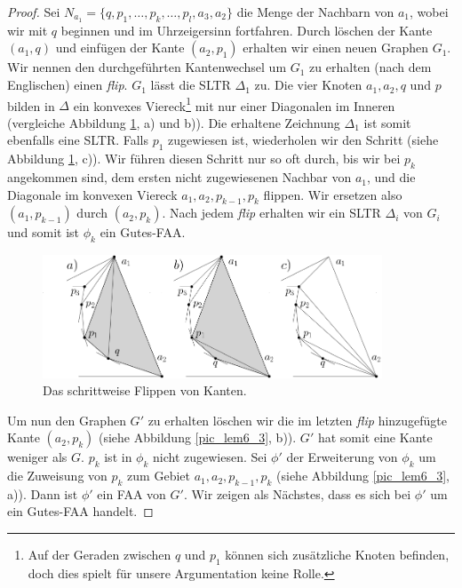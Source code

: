\begin{proof}
Sei $N_{a_1} = \{q,p_1,\ldots,p_k,\ldots,p_l,a_3,a_2\}$ die Menge der Nachbarn von $a_1$, wobei wir mit $q$ beginnen und im Uhrzeigersinn fortfahren. Durch löschen der Kante $(a_1,q)$ und einfügen der Kante $(a_2,p_1)$ erhalten wir einen neuen Graphen $G_1$. Wir nennen den durchgeführten Kantenwechsel um $G_1$ zu erhalten (nach dem Englischen) einen \textit{flip}. $G_1$ lässt die SLTR $\Delta_1$ zu. Die vier Knoten $a_1,a_2,q$ und $p$ bilden in $\Delta$ ein konvexes Viereck\footnote{Auf der Geraden zwischen $q$ und $p_1$ können sich zusätzliche Knoten befinden, doch dies spielt für unsere Argumentation keine Rolle.} mit nur einer Diagonalen im Inneren (vergleiche Abbildung \ref{pic_lem6_2}, a) und b)). Die erhaltene Zeichnung $\Delta_1$ ist somit ebenfalls eine SLTR. Falls $p_1$ zugewiesen ist, wiederholen wir den Schritt (siehe Abbildung \ref{pic_lem6_2}, c)). Wir führen diesen Schritt nur so oft durch, bis wir bei $p_k$ angekommen sind, dem ersten nicht zugewiesenen Nachbar von $a_1$, und die Diagonale im konvexen Viereck $a_1,a_2,p_{k-1},p_k$ flippen. Wir ersetzen also $(a_1,p_{k-1})$ durch $(a_2,p_{k})$. Nach jedem \textit{flip} erhalten wir ein SLTR $\Delta_i$ von $G_i$ und somit ist $\phi_k$ ein Gutes-FAA.

\begin{figure}
	\centering
	  \includegraphics[width=0.9\textwidth]{lem6_2.png}
    	\caption{Das schrittweise Flippen von Kanten.}
    	\label{pic_lem6_2}
\end{figure}

Um nun den Graphen $G'$ zu erhalten löschen wir die im letzten \textit{flip} hinzugefügte Kante $(a_2,p_{k})$ (siehe Abbildung \ref{pic_lem6_3}, b)). $G'$ hat somit eine Kante weniger als $G$. $p_k$ ist in $\phi_k$ nicht zugewiesen. Sei $\phi'$ der Erweiterung von $\phi_k$ um die Zuweisung von $p_k$ zum Gebiet $a_1,a_2,p_{k-1},p_k$ (siehe Abbildung \ref{pic_lem6_3}, a)). Dann ist $\phi'$ ein FAA von $G'$. Wir zeigen als Nächstes, dass es sich bei $\phi'$ um ein Gutes-FAA handelt.


\end{proof}

